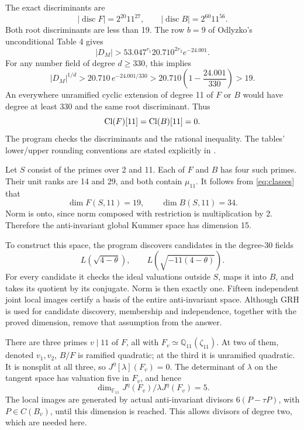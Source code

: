\documentclass[11pt]{article}
\newcommand{\Q}{\mathbb Q}\newcommand{\Z}{\mathbb Z}
\newcommand{\F}{\mathbb F}\newcommand{\OO}{\mathcal O}
\begin{document}
The exact discriminants are
\[
 |\operatorname{disc}F|=2^{20}11^{27},\qquad
 |\operatorname{disc}B|=2^{60}11^{56}.
\]
Both root discriminants are less than 19. The row \(b=9\) of
Odlyzko's unconditional Table 4 \cite{Od} gives
\[
 |D_M|>53.047^{r_1}20.710^{2r_2}e^{-24.001}.
\]
For any number field of degree \(d\ge330\), this implies
\[
 |D_M|^{1/d}>20.710\,e^{-24.001/330}
 >20.710\left(1-\frac{24.001}{330}\right)>19.
\]
An everywhere unramified cyclic extension of degree 11 of \(F\) or
\(B\) would have degree at least 330 and the same root discriminant.
Thus
\begin{equation}\label{eq:classes}
 \operatorname{Cl}(F)[11]=\operatorname{Cl}(B)[11]=0.
\end{equation}
The program  checks the discriminants
and the rational inequality. The tables' lower/upper rounding conventions
are stated explicitly in \cite{OdDescription}.

Let \(S\) consist of the primes over 2 and 11. Each of \(F\) and \(B\)
has four such primes. Their unit ranks are 14 and 29, and both contain
\(\mu_{11}\). It follows from \eqref{eq:classes} that
\[
 \dim F(S,11)=19,\qquad \dim B(S,11)=34.
\]
Norm is onto, since norm composed with restriction is multiplication by
2. Therefore the anti-invariant global Kummer space has dimension 15.

To construct this space, the program discovers candidates in the
degree-30 fields
\[
 L(\sqrt{4-\theta}),\qquad L(\sqrt{-11(4-\theta)}).
\]
For every candidate it checks the ideal valuations outside \(S\),
maps it into \(B\), and takes its quotient by its conjugate. Norm is
then exactly one. Fifteen independent joint local images certify a
basis of the entire anti-invariant space. Although GRH is used for
candidate discovery, membership and independence, together with the
proved dimension, remove that assumption from the answer.

There are three primes \(v\mid11\) of \(F\), all with
\(F_v\simeq\Q_{11}(\zeta_{11})\). At two of them, denoted \(v_1,v_2\),
\(B/F\) is ramified quadratic; at the third it is unramified quadratic.
It is nonsplit at all three, so \(J^\eta[\lambda](F_v)=0\).
The determinant of \(\lambda\) on the tangent space has valuation five
in \(F_v\), and hence
\[
 \dim_{\F_{11}} J^\eta(F_v)/\lambda J^\eta(F_v)=5.
\]
The local images are generated by actual anti-invariant divisors
\(6(P-\tau P)\), with \(P\in C(B_v)\), until this dimension is reached.
This allows divisors of degree two, which are needed here.
\end{document}
